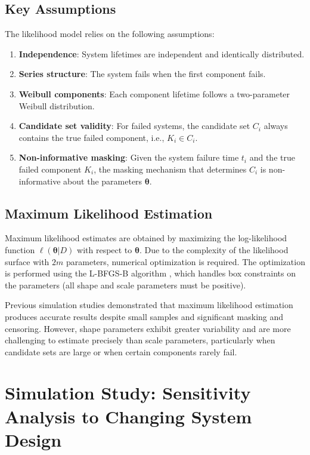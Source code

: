 \documentclass[11pt]{article}
\renewcommand{\v}[1]{\boldsymbol{#1}}
\begin{document}
\subsection{Key Assumptions}

The likelihood model relies on the following assumptions:
\begin{enumerate}
\item \textbf{Independence}: System lifetimes are independent and identically distributed.
\item \textbf{Series structure}: The system fails when the first component fails.
\item \textbf{Weibull components}: Each component lifetime follows a two-parameter Weibull distribution.
\item \textbf{Candidate set validity}: For failed systems, the candidate set $C_i$ always contains the true failed component, i.e., $K_i \in C_i$.
\item \textbf{Non-informative masking}: Given the system failure time $t_i$ and the true failed component $K_i$, the masking mechanism that determines $C_i$ is non-informative about the parameters $\v\theta$.
\end{enumerate}

\subsection{Maximum Likelihood Estimation}

Maximum likelihood estimates are obtained by maximizing the log-likelihood function $\ell(\v\theta | D)$ with respect to $\v\theta$. Due to the complexity of the likelihood surface with $2m$ parameters, numerical optimization is required. The optimization is performed using the L-BFGS-B algorithm \cite{byrd1995}, which handles box constraints on the parameters (all shape and scale parameters must be positive).

Previous simulation studies \cite{towell2023reliability} demonstrated that maximum likelihood estimation produces accurate results despite small samples and significant masking and censoring. However, shape parameters exhibit greater variability and are more challenging to estimate precisely than scale parameters, particularly when candidate sets are large or when certain components rarely fail.

\section{Simulation Study: Sensitivity Analysis to Changing System Design}
\label{sec:simulation-study}
\end{document}
